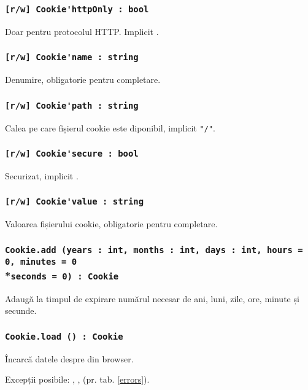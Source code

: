 \subsubsection{\lstinline|[r/w] Cookie'httpOnly : bool|}

Doar pentru protocolul HTTP. Implicit \false.

\subsubsection{\lstinline|[r/w] Cookie'name : string|}

Denumire, obligatorie pentru completare.

\subsubsection{\lstinline|[r/w] Cookie'path : string|}

Calea pe care fișierul cookie este diponibil, implicit \lstinline|"/"|.

\subsubsection{\lstinline|[r/w] Cookie'secure : bool|}

Securizat, implicit \false.

\subsubsection{\lstinline|[r/w] Cookie'value : string|}

Valoarea fișierului cookie, obligatorie pentru completare.

\subsubsection{\lstinline|Cookie.add (years : int, months : int, days : int, hours = 0, minutes = 0|\\*\noindent\lstinline|seconds = 0) : Cookie|}

Adaugă la timpul de expirare numărul necesar de ani, luni, zile, ore, minute și secunde.

\subsubsection{\lstinline|Cookie.load () : Cookie|}

Încarcă datele despre \cookie{} din browser.

Excepții posibile: , ,  (pr. tab. \ref{errors}).

